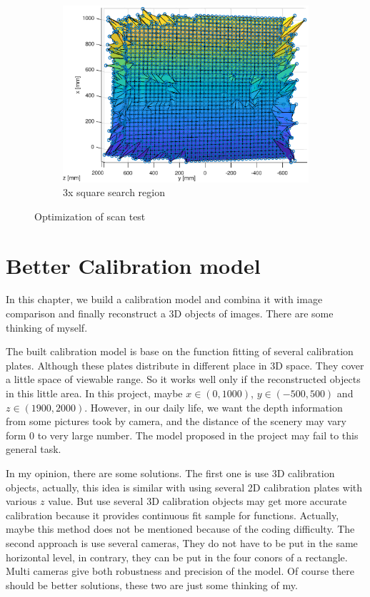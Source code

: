 \begin{figure}[h!]
\begin{subfigure}[t]{0.3\linewidth}
		\includegraphics[width=1\linewidth]{figures/part2/scan3}
		\caption{3x square search region}
		\label{fig:scan_op_c}
	\end{subfigure}
	\caption{Optimization of scan test}
	\label{fig:scan_op}
\end{figure}


\section{Better Calibration model}

In this chapter, we build a calibration model and combina it with image comparison and finally reconstruct a 3D objects of images. There are some thinking of myself. 

The built calibration model is base on the function fitting of several calibration plates. Although these plates distribute in different place in 3D space. They cover a little space of viewable range. So it works well only if the reconstructed objects in this little area. In this project, maybe $x\in (0,1000)$, $y\in (-500,500)$ and $z\in (1900,2000)$. However, in our daily life, we want the depth information from some pictures took by camera, and the distance of the scenery may vary form 0 to very large number. The model proposed in the project may fail to this general task. 

In my opinion, there are some solutions. The first one is use 3D calibration objects, actually, this idea is similar with using several 2D calibration plates with various $z$ value. But use several 3D calibration objects may get more accurate calibration because it provides continuous fit sample for functions. Actually, maybe this method does not be mentioned because of the coding difficulty. The second approach is use several cameras, They do not have to be put in the same horizontal level, in contrary, they can be put in the four conors of a rectangle. Multi cameras give both robustness and precision of the model. Of course there should be better solutions, these two are just some thinking of my.